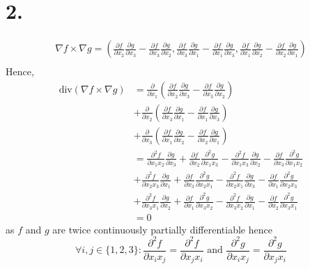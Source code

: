 \documentclass[11pt]{article}
\begin{document}
\section*{2.}
\begin{equation*}
\begin{aligned}
\nabla f \times \nabla g = \left(\frac{\partial f}{\partial x_2} \frac{\partial g}{\partial x_3}- \frac{\partial f}{\partial x_3} \frac{\partial g}{\partial x_2}, \frac{\partial f}{\partial x_3} \frac{\partial g}{\partial x_1}- \frac{\partial f}{\partial x_1} \frac{\partial g}{\partial x_3}, \frac{\partial f}{\partial x_1} \frac{\partial g}{\partial x_2}- \frac{\partial f}{\partial x_2} \frac{\partial g}{\partial x_1} \right) \\
\end{aligned}
\end{equation*}
Hence, 
\begin{equation*}
\begin{aligned}
\text{div}(\nabla f \times \nabla g) &= \frac{\partial}{\partial x_1} \left(\frac{\partial f}{\partial x_2} \frac{\partial g}{\partial x_3}- \frac{\partial f}{\partial x_3} \frac{\partial g}{\partial x_2} \right) \\
&+ \frac{\partial}{\partial x_2} \left( \frac{\partial f}{\partial x_3} \frac{\partial g}{\partial x_1}- \frac{\partial f}{\partial x_1} \frac{\partial g}{\partial x_3} \right) \\
&+ \frac{\partial}{\partial x_3} \left( \frac{\partial f}{\partial x_1} \frac{\partial g}{\partial x_2}- \frac{\partial f}{\partial x_2} \frac{\partial g}{\partial x_1} \right) \\ 
&= \frac{\partial^2 f}{\partial x_1 x_2} \frac{\partial g}{\partial x_3} + \frac{\partial f}{\partial x_2} \frac{\partial^2 g}{\partial x_1 x_3}- \frac{\partial^2 f}{\partial x_1 x_3} \frac{\partial g}{\partial x_2} - \frac{\partial f}{\partial x_3} \frac{\partial^2 g}{\partial x_1 x_2} \\
&+\frac{\partial^2 f}{\partial x_2 x_3} \frac{\partial g}{\partial x_1} + \frac{\partial f}{\partial x_3} \frac{\partial^2 g}{\partial x_2 x_1}- \frac{\partial^2 f}{\partial x_2 x_1} \frac{\partial g}{\partial x_3} - \frac{\partial f}{\partial x_1} \frac{\partial^2 g}{\partial x_2 x_3} \\
&+\frac{\partial^2 f}{\partial x_3 x_1} \frac{\partial g}{\partial x_2} + \frac{\partial f}{\partial x_1} \frac{\partial^2 g}{\partial x_3 x_2}- \frac{\partial^2 f}{\partial x_3 x_2} \frac{\partial g}{\partial x_1} - \frac{\partial f}{\partial x_2} \frac{\partial^2 g}{\partial x_3 x_1} \\
&= 0 
\end{aligned}
\end{equation*}
as $f$ and $g$ are twice continuously partially differentiable hence 
\[\forall i,j \in \{1,2,3\}: \frac{\partial^2 f}{\partial x_i x_j} = \frac{\partial^2 f}{\partial x_j x_i} \text{ and } \frac{\partial^2 g}{\partial x_i x_j} = \frac{\partial^2 g}{\partial x_j x_i}\]
\pagebreak
\end{document}
